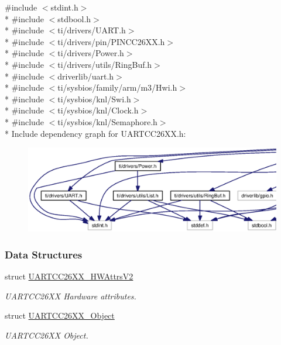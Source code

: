 {\ttfamily \#include $<$stdint.\+h$>$}\\*
{\ttfamily \#include $<$stdbool.\+h$>$}\\*
{\ttfamily \#include $<$ti/drivers/\+U\+A\+R\+T.\+h$>$}\\*
{\ttfamily \#include $<$ti/drivers/pin/\+P\+I\+N\+C\+C26\+X\+X.\+h$>$}\\*
{\ttfamily \#include $<$ti/drivers/\+Power.\+h$>$}\\*
{\ttfamily \#include $<$ti/drivers/utils/\+Ring\+Buf.\+h$>$}\\*
{\ttfamily \#include $<$driverlib/uart.\+h$>$}\\*
{\ttfamily \#include $<$ti/sysbios/family/arm/m3/\+Hwi.\+h$>$}\\*
{\ttfamily \#include $<$ti/sysbios/knl/\+Swi.\+h$>$}\\*
{\ttfamily \#include $<$ti/sysbios/knl/\+Clock.\+h$>$}\\*
{\ttfamily \#include $<$ti/sysbios/knl/\+Semaphore.\+h$>$}\\*
Include dependency graph for U\+A\+R\+T\+C\+C26\+X\+X.\+h\+:
\nopagebreak
\begin{figure}[H]
\begin{center}
\leavevmode
\includegraphics[width=350pt]{_u_a_r_t_c_c26_x_x_8h__incl}
\end{center}
\end{figure}
\subsubsection*{Data Structures}
\begin{DoxyCompactItemize}
\item 
struct \hyperlink{struct_u_a_r_t_c_c26_x_x___h_w_attrs_v2}{U\+A\+R\+T\+C\+C26\+X\+X\+\_\+\+H\+W\+Attrs\+V2}
\begin{DoxyCompactList}\small\item\em U\+A\+R\+T\+C\+C26\+X\+X Hardware attributes. \end{DoxyCompactList}\item 
struct \hyperlink{struct_u_a_r_t_c_c26_x_x___object}{U\+A\+R\+T\+C\+C26\+X\+X\+\_\+\+Object}
\begin{DoxyCompactList}\small\item\em U\+A\+R\+T\+C\+C26\+X\+X Object. \end{DoxyCompactList}\end{DoxyCompactItemize}
